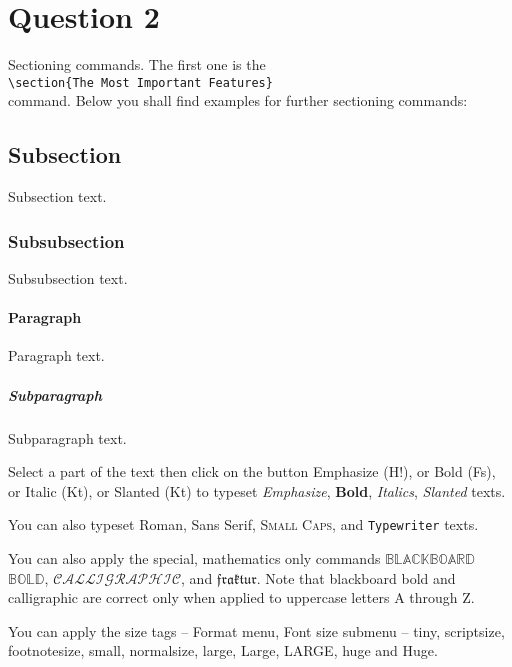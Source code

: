 \documentclass{article}%
\begin{document}
\section{Question 2}

\noindent Sectioning commands. The first one is the\\
\hspace*{\fill} \verb"\section{The Most Important Features}" \hspace*{\fill}\\
command. Below you shall find examples for further sectioning commands:

\subsection{Subsection}
Subsection text.

\subsubsection{Subsubsection}
Subsubsection text.

\paragraph{Paragraph}
Paragraph text.

\subparagraph{Subparagraph}Subparagraph text.\vspace{2mm}

Select a part of the text then click on the button Emphasize (H!), or Bold (Fs), or
Italic (Kt), or Slanted (Kt) to typeset \emph{Emphasize}, \textbf{Bold},
\textit{Italics}, \textsl{Slanted} texts.

You can also typeset \textrm{Roman}, \textsf{Sans Serif}, \textsc{Small Caps}, and
\texttt{Typewriter} texts.

You can also apply the special, mathematics only commands $\mathbb{BLACKBOARD}$
$\mathbb{BOLD}$, $\mathcal{CALLIGRAPHIC}$, and $\mathfrak{fraktur}$. Note that
blackboard bold and calligraphic are correct only when applied to uppercase letters A
through Z.

You can apply the size tags -- Format menu, Font size submenu -- {\tiny tiny},
{\scriptsize scriptsize}, {\footnotesize footnotesize}, {\small small}, {\normalsize
normalsize}, {\large large}, {\Large Large}, {\LARGE LARGE}, {\huge huge} and {\Huge
Huge}.
\end{document}
